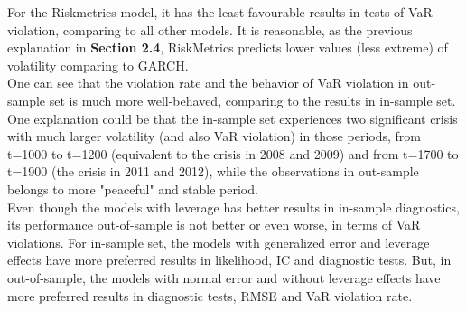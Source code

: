 \documentclass[a4paper]{article}
\begin{document}
For the Riskmetrics model, it has the least favourable results in tests of VaR violation, comparing to all other models. It is reasonable, as the previous explanation in \textbf{Section 2.4}, RiskMetrics predicts lower values (less extreme) of volatility comparing to GARCH. \\

One can see that the violation rate and the behavior of VaR violation in out-sample set is much more well-behaved, comparing to the results in in-sample set. One explanation could be that the in-sample set experiences two significant crisis with much larger volatility (and also VaR violation) in those periods, from t=1000 to t=1200 (equivalent to the crisis in 2008 and 2009) and from t=1700 to t=1900 (the crisis in 2011 and 2012), while the observations in out-sample belongs to more "peaceful" and stable period.\\

Even though the models with leverage has better results in in-sample diagnostics, its performance out-of-sample is not better or even worse, in terms of VaR violations. For in-sample set, the models with generalized error and leverage effects have more preferred results in likelihood, IC and diagnostic tests. But, in out-of-sample, the models with normal error and without leverage effects have more preferred results in diagnostic tests, RMSE and VaR violation rate.   
\end{document}

